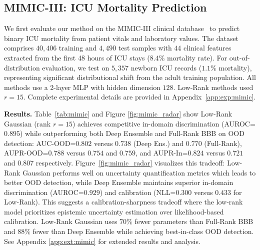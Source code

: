 \documentclass{article}
\theoremstyle{plain}
\theoremstyle{definition}
\theoremstyle{remark}
\begin{document}
\subsection{MIMIC-III: ICU Mortality Prediction}
We first evaluate our method  on the MIMIC-III clinical database~\cite{johnson2016mimic} to predict binary ICU mortality from patient vitals and laboratory values. The dataset comprises $40{,}406$ training and $4{,}490$ test samples with $44$ clinical features extracted from the first 48 hours of ICU stays ($8.4\%$ mortality rate). For out-of-distribution evaluation, we test on $5{,}357$ newborn ICU records ($1.1\%$ mortality), representing significant distributional shift from the adult training population. All methods use a 2-layer MLP with hidden dimension $128$. Low-Rank methods used $r=15$. Complete experimental details are provided in Appendix~\ref{app:exp:mimic}.

\textbf{Results.} 
Table~\ref{tab:mimic} and Figure \ref{fig:mimic_radar} show Low-Rank Gaussian (rank $r=15$) achieves competitive in-domain discrimination (AUROC=$0.895$) while outperforming both Deep Ensemble and Full-Rank BBB on OOD detection: AUC-OOD=$\mathbf{0.802}$ versus $0.738$ (Deep Ens.) and $0.770$ (Full-Rank), AUPR-OOD=$\mathbf{0.788}$ versus $0.754$ and $0.759$, and AUPR-In=$\mathbf{0.824}$ versus $0.721$ and $0.807$ respectively. Figure~\ref{fig:mimic_radar} visualizes this tradeoff: Low-Rank Gaussian performs well on uncertainty quantification metrics which leads to better OOD detection, while Deep Ensemble maintains superior in-domain discrimination (AUROC=$0.929$) and calibration (NLL=$0.300$ versus $0.433$ for Low-Rank). This suggests a calibration-sharpness tradeoff where the low-rank model prioritizes epistemic uncertainty estimation over likelihood-based calibration. Low-Rank Gaussian uses $70\%$ fewer parameters than Full-Rank BBB and $88\%$ fewer than Deep Ensemble while achieving best-in-class OOD detection. See Appendix \ref{app:ext:mimic} for extended results and analysis.
\end{document}
